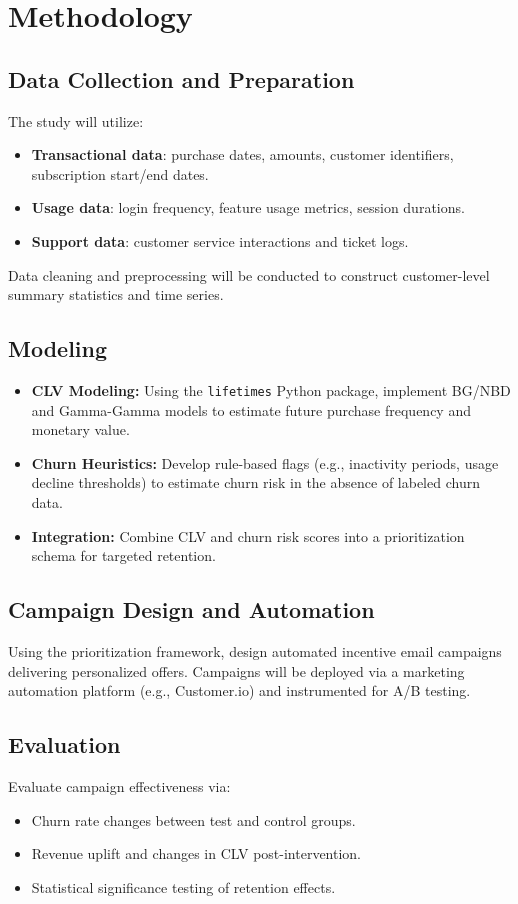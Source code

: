 \documentclass[12pt,a4paper]{article}
\begin{document}
\section{Methodology}
\subsection{Data Collection and Preparation}
The study will utilize:
\begin{itemize}
    \item \textbf{Transactional data}: purchase dates, amounts, customer identifiers, subscription start/end dates.
    \item \textbf{Usage data}: login frequency, feature usage metrics, session durations.
    \item \textbf{Support data}: customer service interactions and ticket logs.
\end{itemize}
Data cleaning and preprocessing will be conducted to construct customer-level summary statistics and time series.

\subsection{Modeling}
\begin{itemize}
    \item \textbf{CLV Modeling:} Using the \texttt{lifetimes} Python package, implement BG/NBD and Gamma-Gamma models to estimate future purchase frequency and monetary value.
    \item \textbf{Churn Heuristics:} Develop rule-based flags (e.g., inactivity periods, usage decline thresholds) to estimate churn risk in the absence of labeled churn data.
    \item \textbf{Integration:} Combine CLV and churn risk scores into a prioritization schema for targeted retention.
\end{itemize}

\subsection{Campaign Design and Automation}
Using the prioritization framework, design automated incentive email campaigns delivering personalized offers. Campaigns will be deployed via a marketing automation platform (e.g., Customer.io) and instrumented for A/B testing.

\subsection{Evaluation}
Evaluate campaign effectiveness via:
\begin{itemize}
    \item Churn rate changes between test and control groups.
    \item Revenue uplift and changes in CLV post-intervention.
    \item Statistical significance testing of retention effects.
\end{itemize}
\end{document}
